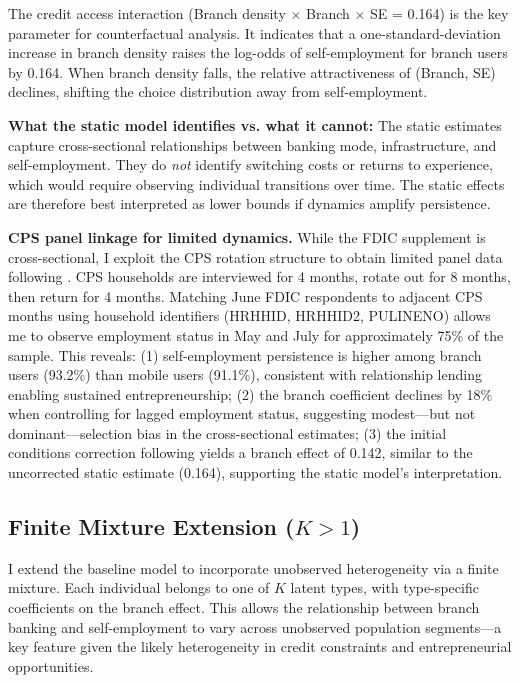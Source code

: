 \documentclass[12pt]{article}
\begin{document}
The credit access interaction (Branch density $\times$ Branch $\times$ SE = 0.164) is the key parameter for counterfactual analysis. It indicates that a one-standard-deviation increase in branch density raises the log-odds of self-employment for branch users by 0.164. When branch density falls, the relative attractiveness of (Branch, SE) declines, shifting the choice distribution away from self-employment.

\textbf{What the static model identifies vs. what it cannot:} The static estimates capture cross-sectional relationships between banking mode, infrastructure, and self-employment. They do \textit{not} identify switching costs or returns to experience, which would require observing individual transitions over time. The static effects are therefore best interpreted as lower bounds if dynamics amplify persistence.

\textbf{CPS panel linkage for limited dynamics.} While the FDIC supplement is cross-sectional, I exploit the CPS rotation structure to obtain limited panel data following \citet{goodstein2022}. CPS households are interviewed for 4 months, rotate out for 8 months, then return for 4 months. Matching June FDIC respondents to adjacent CPS months using household identifiers (HRHHID, HRHHID2, PULINENO) allows me to observe employment status in May and July for approximately 75\% of the sample. This reveals: (1) self-employment persistence is higher among branch users (93.2\%) than mobile users (91.1\%), consistent with relationship lending enabling sustained entrepreneurship; (2) the branch coefficient declines by 18\% when controlling for lagged employment status, suggesting modest---but not dominant---selection bias in the cross-sectional estimates; (3) the initial conditions correction following \citet{heckman1981} yields a branch effect of 0.142, similar to the uncorrected static estimate (0.164), supporting the static model's interpretation.

\subsection{Finite Mixture Extension ($K > 1$)}

I extend the baseline model to incorporate unobserved heterogeneity via a finite mixture. Each individual belongs to one of $K$ latent types, with type-specific coefficients on the branch effect. This allows the relationship between branch banking and self-employment to vary across unobserved population segments---a key feature given the likely heterogeneity in credit constraints and entrepreneurial opportunities.
\end{document}
